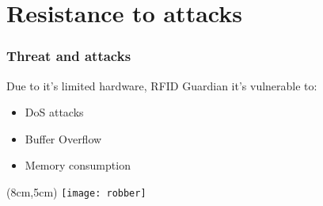 \section{Resistance to attacks}
\begin{frame}
\frametitle{Threat and attacks}
 Due to it's limited hardware, RFID Guardian it's vulnerable to:
 \begin{itemize}
  \item<1-> DoS attacks
  \item<2-> Buffer Overflow
  \item<3-> Memory consumption
 \end{itemize}

  \begin{textblock*}{5cm}(8cm,5cm)
  \texttt{[image: robber]}
 \end{textblock*}

\end{frame}
